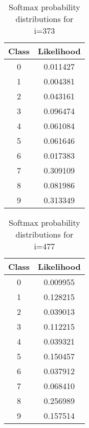 \documentclass[11pt]{article}
\begin{document}
\begin{table}[!th]
\centering
\begin{tabular}{|c|c|}
\hline
Class & Likelihood \\
\hline
0 & 0.011427 \\
1 & 0.004381 \\
2 & 0.043161 \\
3 & 0.096474 \\
4 & 0.061084 \\
5 & 0.061646 \\
6 & 0.017383 \\
7 & 0.309109 \\
8 & 0.081986 \\
9 & 0.313349 \\
\hline
\end{tabular}
\caption{Softmax probability distributions for i=373}
\label{ex:table}
\end{table}

\begin{table}[!th]
\centering
\begin{tabular}{|c|c|}
\hline
Class & Likelihood \\
\hline
0 & 0.009955 \\
1 & 0.128215 \\
2 & 0.039013 \\
3 & 0.112215 \\
4 & 0.039321 \\
5 & 0.150457 \\
6 & 0.037912 \\
7 & 0.068410 \\
8 & 0.256989 \\
9 & 0.157514 \\
\hline
\end{tabular}
\caption{Softmax probability distributions for i=477}
\label{ex:table}
\end{table}
\end{document}
